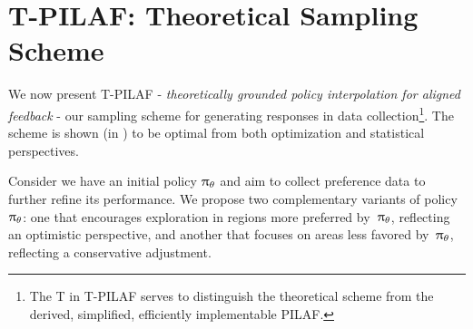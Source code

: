 	
	

	

    \section{T-PILAF: Theoretical Sampling Scheme }
        
	\label{sec:sampling}

	
	We now present T-PILAF - {\em theoretically grounded policy interpolation for aligned feedback} - our sampling scheme for generating responses in data collection\footnote{The T in T-PILAF serves to distinguish the theoretical scheme from the derived, simplified, efficiently implementable PILAF.}. The scheme is shown (in ) to be optimal from both optimization and statistical perspectives. 
    
	Consider we have an {initial} policy $\uppi_{\theta}$ and aim to collect preference data to further refine its performance.
	We propose two complementary variants of policy $\uppi_{\theta}$: one that encourages exploration in regions {more} preferred by~$\uppi_{\theta}$, reflecting an optimistic perspective, and another that focuses on areas {less favored by~$\uppi_{\theta}$}, reflecting a conservative adjustment.
	
